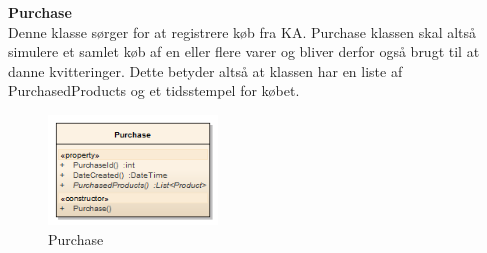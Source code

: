 \textbf{Purchase}\\
Denne klasse sørger for at registrere køb fra \gls{KA}. Purchase klassen skal altså simulere et samlet køb af en eller flere varer og bliver derfor også brugt til at danne kvitteringer. Dette betyder altså at klassen har en liste af PurchasedProducts og et tidsstempel for købet.

\begin{figure}[H]
    \centering
    \includegraphics[width=0.4\textwidth]{Systemdesign/SharedLib/Images/Klasser/Model/Purchase.png}
    \caption{Purchase}
    \label{fig:klasseModelPurch}
\end{figure}



